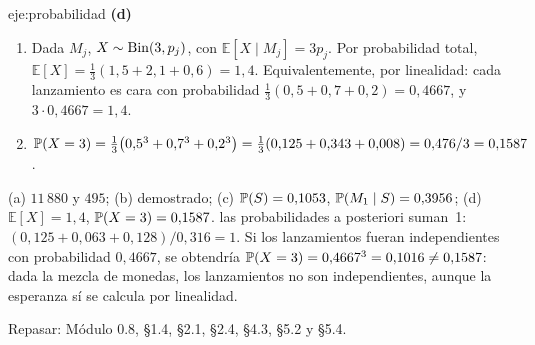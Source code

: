 \begin{solucion}{eje:probabilidad}
\noindent\textbf{(d)}
\begin{enumerate}[label=\arabic*.]
  \item Dada $M_j$, $X\sim\operatorname{Bin}(3,p_j)$, con $\mathbb E[X\mid M_j]=3p_j$. Por probabilidad total, $\mathbb E[X]=\frac13(1{,}5+2{,}1+0{,}6)=1{,}4$. Equivalentemente, por linealidad: cada lanzamiento es cara con probabilidad $\frac13(0{,}5+0{,}7+0{,}2)=0{,}4667$, y $3\cdot0{,}4667=1{,}4$.
  \item $\mathbb{P}(X=3)=\frac13\bigl(0{,}5^{3}+0{,}7^{3}+0{,}2^{3}\bigr)=\frac13(0{,}125+0{,}343+0{,}008)=0{,}476/3=0{,}1587$.
\end{enumerate}
\resultado (a) $11\,880$ y $495$; (b) demostrado; (c) $\mathbb{P}(S)=0{,}1053$, $\mathbb{P}(M_1\mid S)=0{,}3956$; (d) $\mathbb E[X]=1{,}4$, $\mathbb{P}(X=3)=0{,}1587$.
\comprobacion las probabilidades a posteriori suman~1: $(0{,}125+0{,}063+0{,}128)/0{,}316=1$. Si los lanzamientos fueran independientes con probabilidad $0{,}4667$, se obtendría $\mathbb{P}(X=3)=0{,}4667^{3}=0{,}1016\neq0{,}1587$: dada la mezcla de monedas, los lanzamientos no son independientes, aunque la esperanza sí se calcula por linealidad.

\noindent[Criterios: (a) 0{,}5~p cada valor. (b) 1~p. (c) verosimilitudes 0{,}5~p, total 0{,}5~p, Bayes 1~p. (d) esperanza 1~p, $\PP(X=3)$ 1~p.]

\noindent Repasar: Módulo 0.8, §1.4, §2.1, §2.4, §4.3, §5.2 y §5.4.
\end{solucion}

